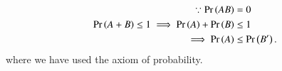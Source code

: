 \begin{align}
\because \Pr\left(AB\right) &= 0
\\
\Pr\left(A+B\right) \leq 1 
\implies\Pr\left(A\right)+\Pr\left(B\right) &\leq 1\\
\implies \Pr\left(A\right) &\leq\Pr\left(B^\prime\right).
\end{align}
where we have used the axiom of probability.
